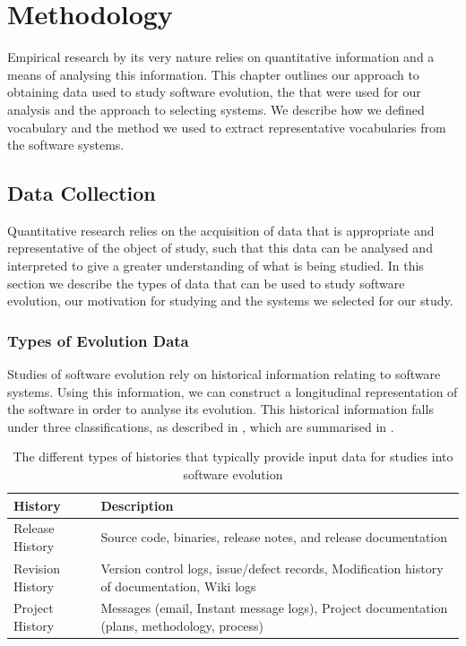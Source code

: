 \chapter{Methodology}
\label{cha:method}

Empirical research by its very nature relies on quantitative information and a means of analysing this information. This chapter outlines our approach to obtaining data used to study software evolution, the {\OSYS} that were used for our analysis and the approach to selecting systems. We describe how we defined vocabulary and the method we used to extract representative vocabularies from the software systems.

\section{Data Collection} %
\label{sec:data_collection}

Quantitative research relies on the acquisition of data that is appropriate and representative of the object of study, such that this data can be analysed and interpreted to give a greater understanding of what is being studied. In this section we describe the types of data that can be used to study software evolution, our motivation for studying {\OSYS} and the systems we selected for our study.

\subsection{Types of Evolution Data} %
\label{sub:types_of_evolution_data}

Studies of software evolution rely on historical information relating to software systems. Using this information, we can construct a longitudinal representation of the software in order to analyse its evolution. This historical information falls under three classifications, as described in \cite{Vasa10a}, which are summarised in .

\begin{table}[t]
\centering
\begin{tabular}{|p{}|p{}|}
\hline
{\bf History} & {\bf Description}\\
\hline \hline
Release History & Source code, binaries, release notes, and release documentation\\
\hline
Revision History & Version control logs, issue/defect records, Modification history of documentation, Wiki logs\\
\hline
Project History & Messages (email, Instant message logs), Project documentation (plans, methodology, process)\\
\hline
\end{tabular}
\vspace{0.2cm}
\caption{The different types of histories that typically provide input data for studies into software evolution}
\label{tab:histories}
\vspace{-0.2cm}
\end{table}

